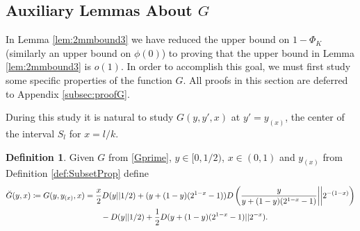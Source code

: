 \documentclass[12pt,reqno]{amsart}
\makeatletter
\numberwithin{equation}{section}
\newcounter{Ccnt}
\newcommand\Co[1]{%
\@ifundefined{C-#1}%
  {\stepcounter{Ccnt}\expandafter\xdef\csname C-#1\endcsname{\arabic{Ccnt}}}%
  {}%
C_{\csname C-#1\endcsname}}
\newtheorem{lemma}[theorem]{Lemma}
\theoremstyle{definition}
\newtheorem{definition}[theorem]{Definition}
\newcommand{\E}{\mathbb{E}}
\newcommand{\gl}{y + (1-y)(2^{1-x} - 1)}
\renewcommand{\[}{\begin{equation}}
\renewcommand{\]}{\end{equation}}
\renewcommand{\|}{\bigg{|}}
\newcommand{\mSet}{\mathcal{M}}
\newcommand{\pSet}{\mathcal{P}}
\newcommand{\stateScale}{Assume that $M=\mSet, p=\pSet$ are deterministic and satisfy Assumption \ref{as:MPScale}. }
\makeatother
\begin{document}

\subsection{Auxiliary Lemmas About $G$}\label{subsub:G}

In Lemma \ref{lem:2mmbound3} we have reduced the upper bound on $1-\Phi_K$ (similarly an upper bound on $\phi(0)$) to proving that the upper bound in Lemma \ref{lem:2mmbound3} is $o(1)$. In order to accomplish this goal, we must first study some specific properties of the function $G$. All proofs in this section are deferred to Appendix \ref{subsec:proofG}. 

During this study it is natural to study $G(y, y', x)$ at $y' = y_{(x)}$, the center of the interval $S_l$ for $x=l/k$.
\begin{definition}
Given $G$ from \eqref{Gprime}, $y \in [0,1/2)$, $x \in (0,1)$ and $y_{(x)}$ from Definition \ref{def:SubsetProp} define
\[\label{eq:g-eps}\begin{split}
\Breve{G}(y, x) \coloneqq G(y, y_{(x)}, x) &= \frac{x}{2}D(y||1/2) + (\gl) D\left(\frac{y}{\gl}\|\|2^{-(1-x)}\right)\\
&\qquad - D(y||1/2) + \frac{1}{2}D(\gl||2^{-x}).
\end{split}\]
\end{definition}
\end{document}
